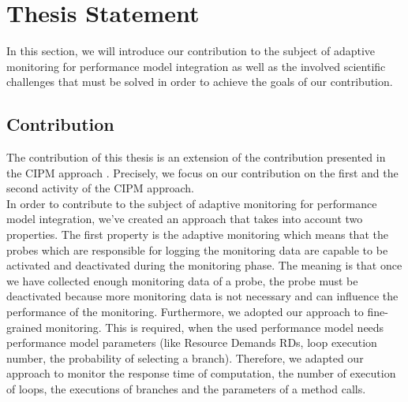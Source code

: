 
\chapter{Thesis Statement}
\label{ch:Thesis Statement}
In this section, we will introduce our contribution to the subject of adaptive monitoring for performance model integration as well as the involved scientific challenges that must be solved in order to achieve the goals of our contribution. 

\section{Contribution}
\label{sec:Contribution}
The contribution of this thesis is an extension of the contribution presented in the  CIPM approach  \cite{mazkatli2018continuous}. Precisely, we focus on our contribution on the first and the second activity of the CIPM approach. \\

In order to contribute to the subject of adaptive monitoring for performance model integration, we’ve created an approach that takes into account two properties. The first property is the adaptive monitoring which means that the probes which are responsible for logging the monitoring data are capable to be activated and deactivated during the monitoring phase. The meaning is that once we have collected enough monitoring data of a probe, the probe must be deactivated because more monitoring data is not necessary and can influence the performance of the monitoring.   Furthermore, we adopted our approach to fine-grained monitoring. This is required, when the used performance model needs performance model parameters (like Resource Demands RDs, loop execution number, the probability of selecting a branch). Therefore, we adapted our approach to monitor the response time of computation, the number of execution of loops, the executions of branches and the parameters of a method calls.\\


